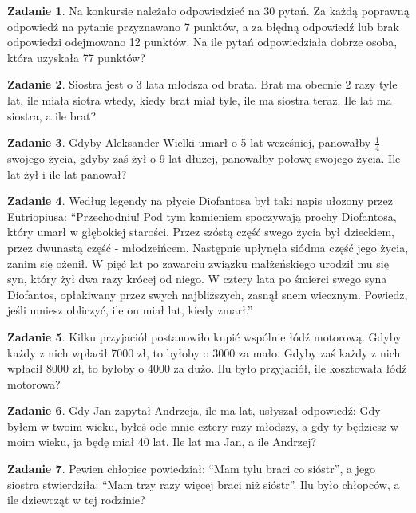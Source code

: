 \documentclass[11pt]{article}
\theoremstyle{definition}
\newtheorem{zad}{Zadanie}
\begin{document}
\begin{zad}
Na konkursie należało odpowiedzieć na 30 pytań. Za każdą poprawną odpowiedź na pytanie przyznawano 7 punktów, a za błędną odpowiedź lub brak odpowiedzi odejmowano 12 punktów. Na ile pytań odpowiedziała dobrze osoba, która uzyskała 77 punktów?
\end{zad}

\begin{zad}
Siostra jest o 3 lata młodsza od brata. Brat ma obecnie 2 razy tyle lat, ile miała siotra wtedy, kiedy brat miał tyle, ile ma siostra teraz. Ile lat ma siostra, a ile brat?
\end{zad}

\begin{zad}
Gdyby Aleksander Wielki umarł o 5 lat wcześniej, panowałby $\frac14$ swojego życia, gdyby zaś żył o 9 lat dłużej, panowałby połowę swojego życia. Ile lat żył i ile lat panował?
\end{zad}

\begin{zad}
Według legendy na płycie Diofantosa był taki napis ułozony przez Eutriopiusa: ``Przechodniu! Pod tym kamieniem spoczywają prochy Diofantosa, który umarł w głębokiej starości. Przez szóstą część swego życia był dzieckiem, przez dwunastą część - młodzeińcem. Następnie upłynęła siódma część jego życia, zanim się ożenił. W pięć lat po zawarciu związku małżeńskiego urodził mu się syn, który żył dwa razy krócej od niego. W cztery lata po śmierci swego syna Diofantos, opłakiwany przez swych najbliższych, zasnął snem wiecznym. Powiedz, jeśli umiesz obliczyć, ile on miał lat, kiedy zmarł.''
\end{zad}

\begin{zad}
Kilku przyjaciół postanowiło kupić wspólnie łódź motorową. Gdyby każdy z nich wpłacił 7000 zł, to byłoby o 3000 za mało. Gdyby zaś każdy z nich wpłacił 8000 zł, to byłoby o 4000 za dużo. Ilu było przyjaciół, ile kosztowała łódź motorowa?
\end{zad}

\begin{zad}
Gdy Jan zapytał Andrzeja, ile ma lat, usłyszał odpowiedź: Gdy byłem w twoim wieku, byłeś ode mnie cztery razy młodszy, a gdy ty będziesz w moim wieku, ja będę miał 40 lat. Ile lat ma Jan, a ile Andrzej?
\end{zad}

\begin{zad}
Pewien chłopiec powiedział: ``Mam tylu braci co sióstr'', a jego siostra stwierdziła: ``Mam trzy razy więcej braci niż sióstr''. Ilu było chłopców, a ile dziewcząt w tej rodzinie?
\end{zad}
\end{document}
